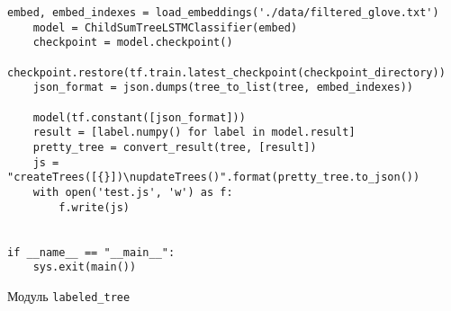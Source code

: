 \begin{lstlisting}[style=app]
    embed, embed_indexes = load_embeddings('./data/filtered_glove.txt')
    model = ChildSumTreeLSTMClassifier(embed)
    checkpoint = model.checkpoint()
    checkpoint.restore(tf.train.latest_checkpoint(checkpoint_directory))
    json_format = json.dumps(tree_to_list(tree, embed_indexes))

    model(tf.constant([json_format]))
    result = [label.numpy() for label in model.result]
    pretty_tree = convert_result(tree, [result])
    js = "createTrees([{}])\nupdateTrees()".format(pretty_tree.to_json())
    with open('test.js', 'w') as f:
        f.write(js)


if __name__ == "__main__":
    sys.exit(main())
\end{lstlisting}

\begin{center}Модуль \texttt{labeled\_tree}\end{center}

